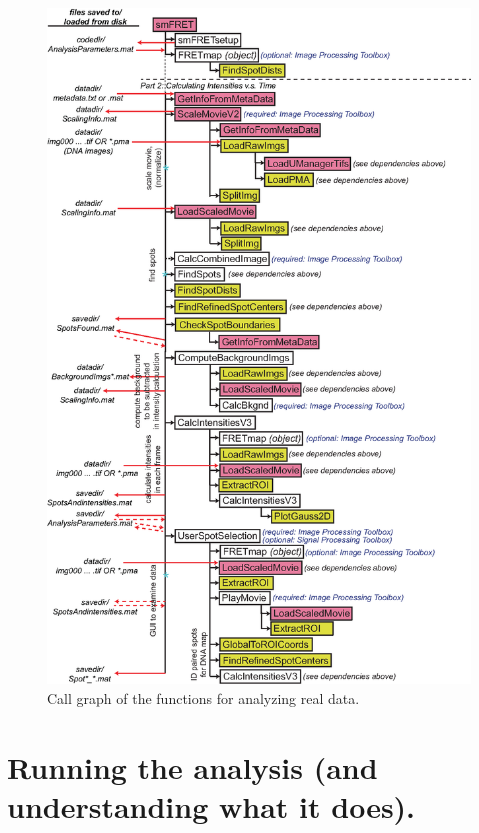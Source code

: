 \documentclass[11pt]{article}
\begin{document}
\begin{figure}[!p]
\begin{center}
\includegraphics[width=5.4in]{CodeFlowchart2.eps}
\caption{Call graph of the functions for analyzing real data.}
\label{fig:CodeConnectivity2}
\end{center}
\end{figure}

\clearpage

\section{Running the analysis (and understanding what it does).}
\end{document}
